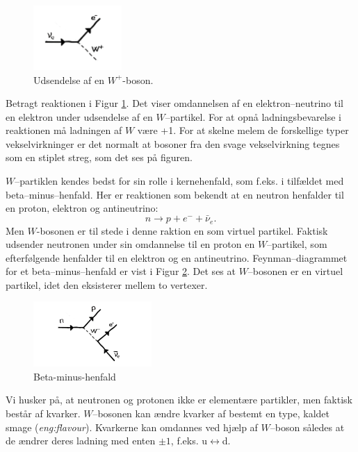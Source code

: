 \begin{figure}[h!]
  \centering
  \includegraphics[width=0.3\textwidth]{KernePartikel/fig_p/weak_vertex.png}
  \caption{ Udsendelse af en $W^+$-boson.}
  \label{fig:weak_vertex}
\end{figure}

Betragt reaktionen i Figur \ref{fig:weak_vertex}.
Det viser omdannelsen af en elektron--neutrino til en elektron under udsendelse af en $W$--partikel. For at opnå ladningsbevarelse i reaktionen må ladningen af $W$ være +1. For at skelne melem de forskellige typer vekselvirkninger er det normalt at bosoner fra den svage vekselvirkning tegnes som en stiplet streg, som det ses på figuren. 

$W$--partiklen kendes bedst for sin rolle i kernehenfald, som f.eks. i tilfældet med beta--minus--henfald. Her er reaktionen som bekendt at en neutron henfalder til en proton, elektron og antineutrino:
\begin{equation}
n \rightarrow p + e^- + \bar{\nu}_e.
\end{equation}
Men $W$-bosonen er til stede i denne raktion en som virtuel partikel. Faktisk udsender neutronen under sin omdannelse til en proton en $W$--partikel, som efterfølgende henfalder til en elektron og en antineutrino. Feynman--diagrammet for et beta--minus--henfald er vist i Figur \ref{fig:beta_minus}. Det ses at $W$--bosonen er en virtuel partikel, idet den eksisterer mellem to vertexer. 

\begin{figure}[h!]
  \centering
  \includegraphics[width=0.4\textwidth]{KernePartikel/fig_p/beta_minus.png}
  \caption{ Beta-minus-henfald}
  \label{fig:beta_minus}
\end{figure}

Vi husker på, at neutronen og protonen ikke er elementære partikler, men faktisk består af kvarker. $W$--bosonen kan ændre kvarker af bestemt en type, kaldet smage (\emph{eng:flavour}). Kvarkerne kan omdannes ved hjælp af $W$--boson således at de ændrer deres ladning med enten $\pm1$, f.eks. u$\leftrightarrow$d. 

